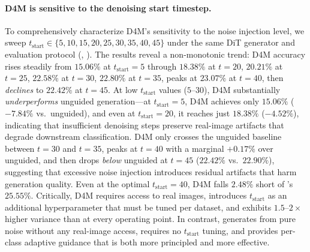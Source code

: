 \paragraph{D4M is sensitive to the denoising start timestep.}
To comprehensively characterize D4M's sensitivity to the noise injection level, we sweep $t_{\text{start}} \in \{5, 10, 15, 20, 25, 30, 35, 40, 45\}$ under the same DiT generator and evaluation protocol (, ). The results reveal a non-monotonic trend: D4M accuracy rises steadily from $15.06\%$ at $t_{\text{start}}{=}5$ through $18.38\%$ at $t{=}20$, $20.21\%$ at $t{=}25$, $22.58\%$ at $t{=}30$, $22.80\%$ at $t{=}35$, peaks at $23.07\%$ at $t{=}40$, then \emph{declines} to $22.42\%$ at $t{=}45$. At low $t_{\text{start}}$ values ($5$--$30$), D4M substantially \emph{underperforms} unguided generation---at $t_{\text{start}}{=}5$, D4M achieves only $15.06\%$ ($-7.84\%$ vs.\ unguided), and even at $t_{\text{start}}{=}20$, it reaches just $18.38\%$ ($-4.52\%$), indicating that insufficient denoising steps preserve real-image artifacts that degrade downstream classification. D4M only crosses the unguided baseline between $t{=}30$ and $t{=}35$, peaks at $t{=}40$ with a marginal $+0.17\%$ over unguided, and then drops \emph{below} unguided at $t{=}45$ ($22.42\%$ vs.\ $22.90\%$), suggesting that excessive noise injection introduces residual artifacts that harm generation quality. Even at the optimal $t_{\text{start}}{=}40$, D4M falls $2.48\%$ short of \cags{}'s $25.55\%$. Critically, D4M requires access to real images, introduces $t_{\text{start}}$ as an additional hyperparameter that must be tuned per dataset, and exhibits $1.5$--$2\times$ higher variance than \cags{} at every operating point. In contrast, \cags{} generates from pure noise without any real-image access, requires no $t_{\text{start}}$ tuning, and provides per-class adaptive guidance that is both more principled and more effective.

